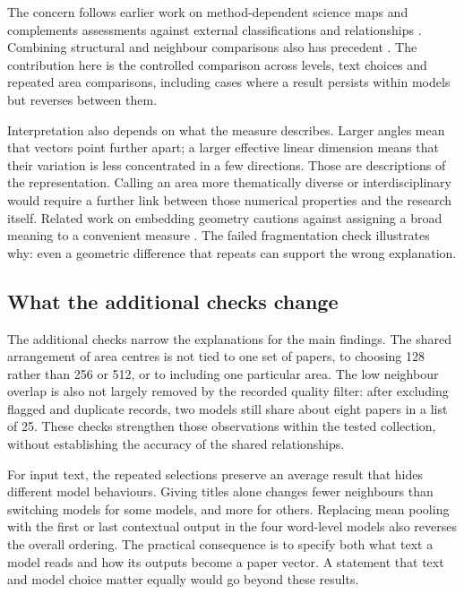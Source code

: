 \documentclass[12pt]{article}
\begin{document}
The concern follows earlier work on method-dependent science maps \citep{refa0d2d707e6,ref6a2f5912bc} and complements assessments against external classifications and relationships \citep{refbe130e2973,refc0e2cc29e0}. Combining structural and neighbour comparisons also has precedent \citep{ref4e1e0d5582}. The contribution here is the controlled comparison across levels, text choices and repeated area comparisons, including cases where a result persists within models but reverses between them.

Interpretation also depends on what the measure describes. Larger angles mean that vectors point further apart; a larger effective linear dimension means that their variation is less concentrated in a few directions. Those are descriptions of the representation. Calling an area more thematically diverse or interdisciplinary would require a further link between those numerical properties and the research itself. Related work on embedding geometry cautions against assigning a broad meaning to a convenient measure \citep{rudman-etal-2022-isoscore}. The failed fragmentation check illustrates why: even a geometric difference that repeats can support the wrong explanation.

\subsection{What the additional checks change}
The additional checks narrow the explanations for the main findings. The shared arrangement of area centres is not tied to one set of papers, to choosing 128 rather than 256 or 512, or to including one particular area. The low neighbour overlap is also not largely removed by the recorded quality filter: after excluding flagged and duplicate records, two models still share about eight papers in a list of 25. These checks strengthen those observations within the tested collection, without establishing the accuracy of the shared relationships.

For input text, the repeated selections preserve an average result that hides different model behaviours. Giving titles alone changes fewer neighbours than switching models for some models, and more for others. Replacing mean pooling with the first or last contextual output in the four word-level models also reverses the overall ordering. The practical consequence is to specify both what text a model reads and how its outputs become a paper vector. A statement that text and model choice matter equally would go beyond these results.
\end{document}
